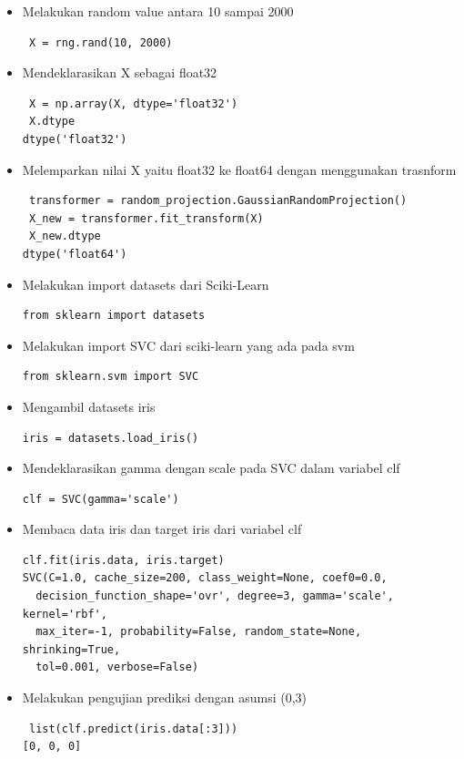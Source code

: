 \begin{enumerate}
\begin{itemize}
\item Melakukan random value antara 10 sampai 2000
\begin{verbatim}
 X = rng.rand(10, 2000)
\end{verbatim}

\item Mendeklarasikan X sebagai float32
\begin{verbatim}
 X = np.array(X, dtype='float32')
 X.dtype
dtype('float32')
\end{verbatim}

\item Melemparkan nilai X yaitu float32 ke float64 dengan menggunakan trasnform
\begin{verbatim}
 transformer = random_projection.GaussianRandomProjection()
 X_new = transformer.fit_transform(X)
 X_new.dtype
dtype('float64')
\end{verbatim}

\item Melakukan import datasets dari Sciki-Learn
\begin{verbatim}
from sklearn import datasets
\end{verbatim}

\item Melakukan import SVC dari sciki-learn yang ada pada svm
\begin{verbatim}
from sklearn.svm import SVC
\end{verbatim}

\item Mengambil datasets iris
\begin{verbatim}
iris = datasets.load_iris()
\end{verbatim}

\item Mendeklarasikan gamma dengan scale pada SVC dalam variabel clf
\begin{verbatim}
clf = SVC(gamma='scale')
\end{verbatim}

\item Membaca data iris dan target iris dari variabel clf
\begin{verbatim}
clf.fit(iris.data, iris.target)  
SVC(C=1.0, cache_size=200, class_weight=None, coef0=0.0,
  decision_function_shape='ovr', degree=3, gamma='scale', kernel='rbf',
  max_iter=-1, probability=False, random_state=None, shrinking=True,
  tol=0.001, verbose=False)
\end{verbatim}

\item Melakukan pengujian prediksi dengan asumsi (0,3)
\begin{verbatim}
 list(clf.predict(iris.data[:3]))
[0, 0, 0]
\end{verbatim}


\end{itemize}
\end{enumerate}
